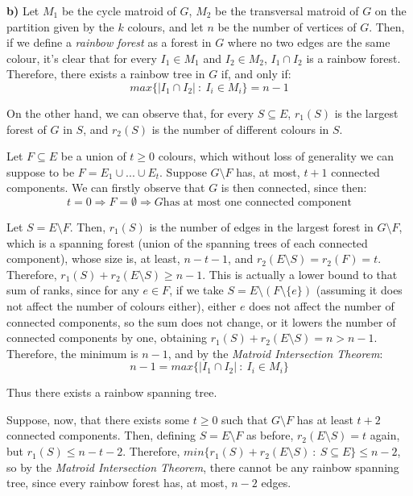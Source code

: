 \documentclass[12pt]{article}
\begin{document}
\textbf{b)} Let $M_{1}$ be the cycle matroid of $G$, $M_{2}$ be the transversal matroid of $G$ on the partition given by the $k$ colours, and let $n$ be the number of vertices of $G$. Then, if we define a \textit{rainbow forest} as a forest in $G$ where no two edges are the same colour, it's clear that for every $I_{1} \in M_{1}$ and $I_{2} \in M_{2}$, $I_{1} \cap I_{2}$ is a rainbow forest. Therefore, there exists a rainbow tree in $G$ if, and only if: $$max \lbrace |I_{1} \cap I_{2} | \ : \ I_{i} \in M_{i} \rbrace = n-1$$

On the other hand, we can observe that, for every $S \subseteq E$, $r_{1}(S)$ is the largest forest of $G$ in $S$, and $r_{2}(S)$ is the number of different colours in $S$. 

Let $F \subseteq E$ be a union of $t \geq 0$ colours, which without loss of generality we can suppose to be $F = E_{1} \cup ... \cup E_{t}$. Suppose $G \setminus F$ has, at most, $t+1$ connected components. We can firstly observe that $G$ is then connected, since then: $$t=0 \Rightarrow F = \emptyset \Rightarrow G \text{has at most one connected component}$$

Let $S = E \setminus F$. Then, $r_{1}(S)$ is the number of edges in the largest forest in $G \setminus F$, which is a spanning forest (union of the spanning trees of each connected component), whose size is, at least, $n-t-1$, and $r_{2}(E \setminus S) = r_{2}(F) = t$. Therefore, $r_{1}(S) + r_{2}(E \setminus S) \geq n-1$. This is actually a lower bound to that sum of ranks, since for any $e \in F$, if we take $S = E \setminus (F \setminus \lbrace e \rbrace )$ (assuming it does not affect the number of colours either), either $e$ does not affect the number of connected components, so the sum does not change, or it lowers the number of connected components by one, obtaining $r_{1}(S) + r_{2}(E \setminus S) = n > n-1$. Therefore, the minimum is $n-1$, and by the \textit{Matroid Intersection Theorem}: $$n-1 = max \lbrace |I_{1} \cap I_{2} | \ : \ I_{i} \in M_{i} \rbrace$$

Thus there exists a rainbow spanning tree.

Suppose, now, that there exists some $t \geq 0$ such that $G \setminus F$ has at least $t+2$ connected components. Then, defining $S = E \setminus F$ as before, $r_{2}(E \setminus S) = t$ again, but $r_{1}(S) \leq n-t-2$. Therefore, $min \lbrace r_{1}(S) + r_{2}(E \setminus S) \ : \ S \subseteq E \rbrace \leq n-2$, so by the \textit{Matroid Intersection Theorem}, there cannot be any rainbow spanning tree, since every rainbow forest has, at most, $n-2$ edges.
\end{document}
